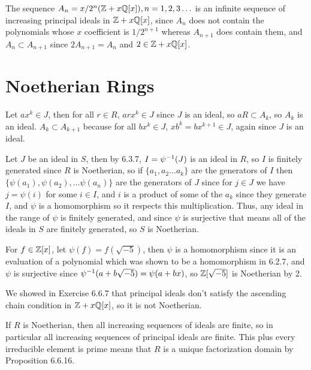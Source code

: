 \documentclass[11pt, oneside]{article}   	%
\begin{document}
The sequence $A_n = x/2^n(\mathbb{Z} + x\mathbb{Q}[x]), n=1, 2, 3\ldots$ is an infinite sequence of increasing principal ideals in $\mathbb{Z} + x\mathbb{Q}[x]$, since $A_{n}$ does not contain the polynomials whose $x$ coefficient is $1/2^{n+1}$ whereas $A_{n+1}$ does contain them, and $A_n \subset A_{n+1}$ since $2A_{n+1} = A_n$ and $2 \in \mathbb{Z} + x\mathbb{Q}[x]$.
\ee 
\section{Noetherian Rings}
\be
\item Let $ax^k \in J$, then for all $r \in R$, $arx^k \in J$ since $J$ is an ideal, so $aR \subset A_k$, so $A_k$ is an ideal. $A_k \subset A_{k+1}$ because for all $bx^k \in J$, $xb^k = bx^{k+1} \in J$, again since $J$ is an ideal.
\item Let $J$ be an ideal in $S$, then by 6.3.7, $I = \psi^{-1}(J)$ is an ideal in $R$, so $I$ is finitely generated since $R$ is Noetherian, so if $\{a_1, a_2 \ldots a_k\}$ are the generators of $I$ then $\{\psi(a_1), \psi(a_2), \ldots \psi(a_n)\}$ are the generators of $J$ since for $j \in J$ we have $j = \psi(i)$ for some $i \in I$, and $i$ is a product of some of the $a_k$ since they generate $I$, and $\psi$ is a homomorphism so it respects this multiplication. Thus, any ideal in the range of $\psi$ is finitely generated, and since $\psi$ is surjective that means all of the ideals in $S$ are finitely generated, so $S$ is Noetherian.
\item For $f \in \mathbb{Z}[x]$, let $\psi(f) = f(\sqrt{-5})$, then $\psi$ is a homomorphism since it is an evaluation of a polynomial which was shown to be a homomorphism in 6.2.7, and $\psi$ is surjective since $\psi^{-1}(a + b\sqrt{-5}) = \psi(a + bx)$, so $\mathbb{Z}[\sqrt{-5}]$ is Noetherian by 2.
\item We showed in Exercise 6.6.7 that principal ideals don't satisfy the ascending chain condition in $\mathbb{Z} + x\mathbb{Q}[x]$, so it is not Noetherian.
\item If $R$ is Noetherian, then all increasing sequences of ideals are finite, so in particular all increasing sequences of principal ideals are finite. This plus every irreducible element is prime means that $R$ is a unique factorization domain by Proposition 6.6.16.
\ee 
\end{document}
